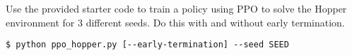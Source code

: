 \item {}

Use the provided starter code to train a policy using PPO to solve the Hopper environment for 3 different seeds. Do this with and without early termination.


\begin{lstlisting}
$ python ppo_hopper.py [--early-termination] --seed SEED
\end{lstlisting}
